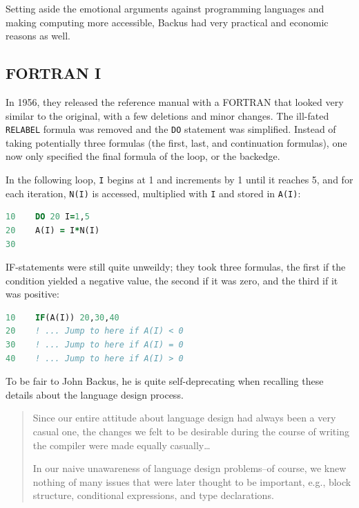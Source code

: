 Setting aside the emotional arguments against programming languages and making
computing more accessible, Backus had very practical and economic reasons as well.

\subsection{FORTRAN I}

In 1956, they released the reference manual  with a FORTRAN
that looked very similar to the original, with a few deletions and minor changes.
The ill-fated \texttt{RELABEL} formula was removed and the \texttt{DO} statement was simplified.
Instead of taking potentially three formulas (the first, last, and continuation formulas),
one now only specified the final formula of the loop, or the \gls{backedge}.

In the following loop, \texttt{I} begins at 1 and increments by 1 until it reaches 5, and for
each iteration, \texttt{N(I)} is accessed, multiplied with \texttt{I} and stored in \texttt{A(I)}:

\begin{lstlisting}[language=Fortran,frame=single]
10    DO 20 I=1,5
20    A(I) = I*N(I)
30
\end{lstlisting}

IF-statements were still quite unweildy; they took three formulas, the first if the
condition yielded a negative value, the second if it was zero, and the third if it was positive:

\begin{lstlisting}[language=Fortran,frame=single]
10    IF(A(I)) 20,30,40
20    ! ... Jump to here if A(I) < 0
30    ! ... Jump to here if A(I) = 0
40    ! ... Jump to here if A(I) > 0
\end{lstlisting}

To be fair to John Backus, he is quite self-deprecating when recalling these details about the
language design process.

\begin{quotation}
	Since our entire attitude about language design had always been a
	very casual one, the changes we felt to be desirable during the course
	of writing the compiler were made equally casually\dots

	In our naive unawareness of language design problems--of course,
	we knew nothing of many issues that were later thought to be important,
	e.g., block structure, conditional expressions, and type declarations.
\end{quotation}

